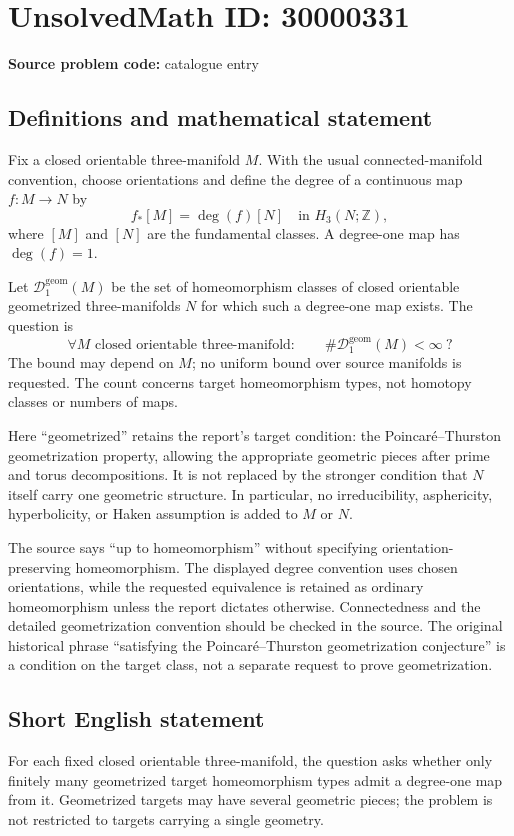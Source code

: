 \documentclass[11pt]{article}
\newcommand{\Z}{\mathbb{Z}}
\begin{document}
\section*{UnsolvedMath ID: 30000331}
\textbf{Source problem code:} catalogue entry
\subsection{Definitions and mathematical statement}
Fix a closed orientable three-manifold $M$. With the usual connected-manifold convention, choose orientations and define the degree of a continuous map $f:M\to N$ by
\[
 f_*[M]=\deg(f)[N]\quad\text{in }H_3(N;\Z),
\]
where $[M]$ and $[N]$ are the fundamental classes. A degree-one map has $\deg(f)=1$.

Let $\mathcal D_1^{\mathrm{geom}}(M)$ be the set of homeomorphism classes of closed orientable geometrized three-manifolds $N$ for which such a degree-one map exists. The question is
\[
 \forall M\text{ closed orientable three-manifold}:\qquad
 \#\mathcal D_1^{\mathrm{geom}}(M)<\infty\ ?
\]
The bound may depend on $M$; no uniform bound over source manifolds is requested. The count concerns target homeomorphism types, not homotopy classes or numbers of maps.

Here ``geometrized'' retains the report's target condition: the Poincar\'e--Thurston geometrization property, allowing the appropriate geometric pieces after prime and torus decompositions. It is not replaced by the stronger condition that $N$ itself carry one geometric structure. In particular, no irreducibility, asphericity, hyperbolicity, or Haken assumption is added to $M$ or $N$.

The source says ``up to homeomorphism'' without specifying orientation-preserving homeomorphism. The displayed degree convention uses chosen orientations, while the requested equivalence is retained as ordinary homeomorphism unless the report dictates otherwise. Connectedness and the detailed geometrization convention should be checked in the source. The original historical phrase ``satisfying the Poincar\'e--Thurston geometrization conjecture'' is a condition on the target class, not a separate request to prove geometrization.
\subsection{Short English statement}
For each fixed closed orientable three-manifold, the question asks whether only finitely many geometrized target homeomorphism types admit a degree-one map from it. Geometrized targets may have several geometric pieces; the problem is not restricted to targets carrying a single geometry.
\end{document}
